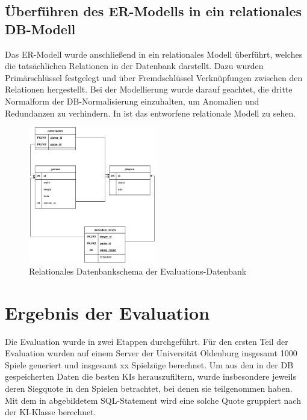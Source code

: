 \subsection{Überführen des \ac{ER}-Modells in ein relationales \acl{DB}-Modell}
\label{subsec:db-schema}

Das \ac{ER}-Modell wurde anschließend in ein relationales Modell überführt, welches die tatsächlichen Relationen in der
Datenbank darstellt.
Dazu wurden Primärschlüssel festgelegt und über Fremdschlüssel Verknüpfungen zwischen den Relationen hergestellt.
Bei der Modellierung wurde darauf geachtet, die dritte Normalform der \ac{DB}-Normalisierung einzuhalten,
um Anomalien und Redundanzen zu verhindern.
In  ist das entworfene relationale Modell zu sehen.

\begin{figure}[htb]
	\centering
	\includegraphics[width=0.5\textwidth]{Bilder/relationales_db_schema.png}
	\caption{Relationales Datenbankschema der Evaluations-Datenbank}
	\label{fig:relationales-db-schema}
\end{figure}

\section{Ergebnis der Evaluation}
\label{sec:ergebnis-evaluation}

Die Evaluation wurde in zwei Etappen durchgeführt.
Für den ersten Teil der Evaluation wurden auf einem Server der Universität Oldenburg insgesamt 1000 Spiele generiert und
insgesamt xx Spielzüge berechnet.
Um aus den in der \ac{DB} gespeicherten Daten die besten \ac{KI}s herauszufiltern, wurde insbesondere jeweils deren
Siegquote in den Spielen betrachtet, bei denen sie teilgenommen haben.
Mit dem in  abgebildetem SQL-Statement wird eine solche Quote gruppiert nach der \ac{KI}-Klasse
berechnet.

